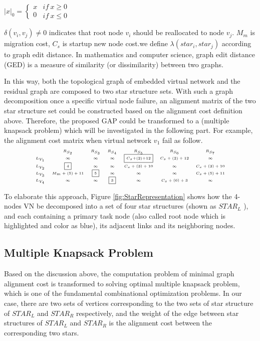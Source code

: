 $|x|_0 = \left\{ \begin{array}{l}
{x}\\
0
\end{array} \right.\begin{array}{*{20}{c}}
if\ x\geq 0\\
{if\ x\leq 0}
\end{array}$

$\delta(v_i,v_j)\neq 0$ indicates that  root node $v_i$ should be reallocated to node $v_j$. $M_m$ is migration cost, $C_s$ is startup new node cost.we define $\lambda(star_i,star_j)$ according to graph edit distance\cite{sanfeliu1983distance}. In mathematics and computer science, graph edit distance (GED) is a measure of similarity (or dissimilarity) between two graphs.

In this way, both the topological graph of  embedded virtual network and the residual graph are composed to two star structure sets. With such a graph decomposition once a specific virtual node failure, an alignment matrix of the two star structure set could be constructed based on the alignment cost definition above. Therefore, the proposed GAP could be transformed to a (multiple knapsack problem) which will be investigated in the following part. For example, the alignment cost matrix when virtual network $v_1$ fail as follow.
\begin{equation*}
\tiny{
 {\begin{array}{*{20}{c}}
&R_{S_{2}}&R_{S_3}&R_{S_4}&R_{S_5}&R_{S_6}&R_{S_{7}}\\
{L_{V_1}}&\infty&\infty&\infty&\fbox{$C_{s}$+(2)+12}&C_{s}+(2)+12&\infty\\
L_{V_2}&\fbox{4}&\infty&\infty&C_{s}+(3)+10&\infty&C_{s}+(3)+10\\
L_{V_3}&M_{m}+(5)+11&\fbox{5}&\infty&\infty&\infty&C_{s}+(5)+11\\
L_{V_4}&\infty&\infty&\fbox{3}&\infty&C_{s}+(6)+3&\infty\\
\end{array}}
}
\label{lab:Node1FaliureAlignmentMatrix}
\end{equation*}

To elaborate this approach, Figure \ref{fig:StarRepresentation} shows how the 4-nodes VN be decomposed into a set of four star structures (shown as $STAR_L$ ), and each containing a primary task node (also called root node which is highlighted and color as blue), its adjacent links and its neighboring nodes.

\subsection{Multiple Knapsack Problem}
Based on the discussion above, the computation problem of minimal graph alignment cost is transformed to solving optimal multiple knapsack problem, which is one of the fundamental combinational optimization problems. In our case, there are two sets of vertices corresponding to the two sets of star structure of $STAR_L$ and $STAR_R$ respectively, and the weight of the edge between star structures of $STAR_L$ and $STAR_R$ is the alignment cost between the corresponding two stars.

